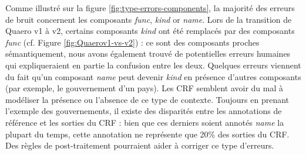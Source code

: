 \documentclass[12pt,a4paper,times,twoside,openright]{report}
\begin{document}

Comme illustré sur la figure \ref{fig:type-errors-components}, la majorité des erreurs de bruit concernent les composants \emph{func}, \emph{kind} or \emph{name}. Lors de la transition de Quaero v1 à v2, certains composants \emph{kind} ont été remplacés par des composants \emph{func} (cf. Figure \ref{fig:Quaerov1-vs-v2}) : ce sont des composants proches sémantiquement, nous avons également trouvé de potentielles erreurs humaines qui expliqueraient en partie la confusion entre les deux. Quelques erreurs viennent du fait qu'un composant \emph{name} peut devenir \emph{kind} en présence d'autres composants (par exemple, le gouvernement d'un pays). Les CRF semblent avoir du mal à modéliser la présence ou l'absence de ce type de contexte. Toujours en prenant l'exemple des gouvernements, il existe des disparités entre les annotations de référence et les sorties du CRF : bien que ces derniers soient annotés \emph{name} la plupart du temps, cette annotation ne représente que 20\% des sorties du CRF. Des règles de post-traitement pourraient aider à corriger ce type d'erreurs.
\end{document}
